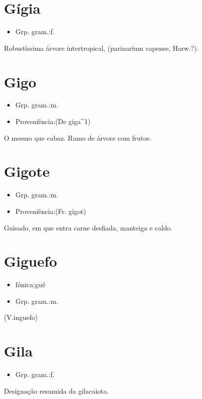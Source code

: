 \section{Gígia}
\begin{itemize}
\item {Grp. gram.:f.}
\end{itemize}
Robustíssima árvore intertropical, (\textunderscore parinarium capense\textunderscore , Harw.?).
\section{Gigo}
\begin{itemize}
\item {Grp. gram.:m.}
\end{itemize}
\begin{itemize}
\item {Proveniência:(De \textunderscore giga\textunderscore ^1)}
\end{itemize}
O mesmo que \textunderscore cabaz\textunderscore .
Ramo de árvore com frutos.
\section{Gigote}
\begin{itemize}
\item {Grp. gram.:m.}
\end{itemize}
\begin{itemize}
\item {Proveniência:(Fr. \textunderscore gigot\textunderscore )}
\end{itemize}
Guisado, em que entra carne desfiada, manteiga e caldo.
\section{Giguefo}
\begin{itemize}
\item {fónica:guê}
\end{itemize}
\begin{itemize}
\item {Grp. gram.:m.}
\end{itemize}
(V.inguefo)
\section{Gila}
\begin{itemize}
\item {Grp. gram.:f.}
\end{itemize}
Designação resumida da \textunderscore gilacaiota\textunderscore .
